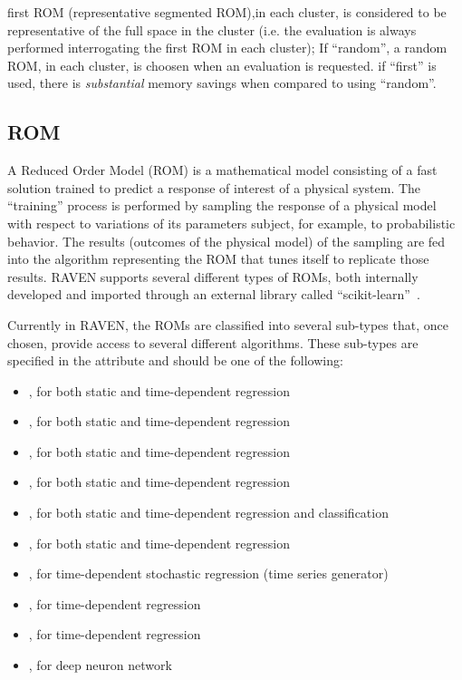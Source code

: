 {\begin{itemize}
        first ROM (representative segmented ROM),in each cluster, is considered to
         be representative of the full space in the cluster (i.e. the evaluation is always performed
         interrogating the first ROM in each cluster); If ``random'', a random ROM, in each cluster,
         is choosen when an evaluation is requested.
	 \nb if ``first'' is used, there is \emph{substantial} memory savings when compared to using
	 ``random''.
    \end{itemize}
}

\subsection{ROM}
\label{subsec:models_ROM}
A Reduced Order Model (ROM) is a mathematical model consisting of a fast
solution trained to predict a response of interest of a physical system.
%
The ``training'' process is performed by sampling the response of a physical
model with respect to variations of its parameters subject, for example, to
probabilistic behavior.
%
The results (outcomes of the physical model) of the sampling are fed into the
algorithm representing the ROM that tunes itself to replicate those results.
%
RAVEN supports several different types of ROMs, both internally developed and
imported through an external library called ``scikit-learn''~\cite{SciKitLearn}.

Currently in RAVEN, the ROMs are classified into several sub-types that, once chosen,
provide access to several different algorithms.
%
These sub-types are specified in the  attribute and should be
one of the following:
\begin{itemize}
  \item {}, for both static and time-dependent regression
  \item {}, for both static and time-dependent regression
  \item {}, for both static and time-dependent regression
  \item {}, for both static and time-dependent regression
  \item {}, for both static and time-dependent regression and classification
  \item {}, for both static and time-dependent regression
  \item {}, for time-dependent stochastic regression (time series generator)
  \item {}, for time-dependent regression
  \item {}, for time-dependent regression
  \item {}, for deep neuron network
\end{itemize}

